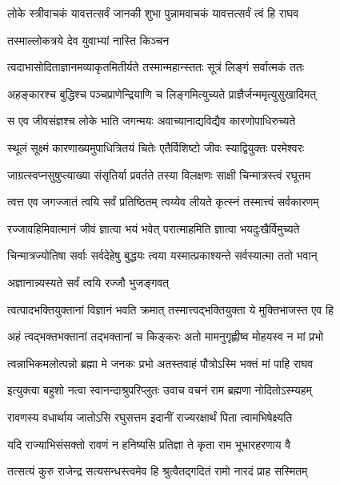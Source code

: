 \twolineshloka
{लोके स्त्रीवाचकं यावत्तत्सर्वं जानकी शुभा}
{पुन्नामवाचकं यावत्तत्सर्वं त्वं हि राघव} %

\onelineshloka
{तस्माल्लोकत्रये देव युवाभ्यां नास्ति किञ्चन} %

\twolineshloka
{त्वदाभासोदिताज्ञानमव्याकृतमितीर्यते}
{तस्मान्महान्स्ततः सूत्रं लिङ्गं सर्वात्मकं ततः} %

\twolineshloka
{अहङ्कारश्च बुद्धिश्च पञ्चप्राणेन्द्रियाणि च}
{लिङ्गमित्युच्यते प्राज्ञैर्जन्ममृत्युसुखादिमत्} %

\twolineshloka
{स एव जीवसंज्ञश्च लोके भाति जगन्मयः}
{अवाच्यानाद्यविद्यैव कारणोपाधिरुच्यते} %

\twolineshloka
{स्थूलं सूक्ष्मं कारणाख्यमुपाधित्रितयं चितेः}
{एतैर्विशिष्टो जीवः स्याद्वियुक्तः परमेश्वरः} %

\twolineshloka
{जाग्रत्स्वप्नसुषुप्त्याख्या संसृतिर्या प्रवर्तते}
{तस्या विलक्षणः साक्षी चिन्मात्रस्त्वं रघूत्तम} %

\twolineshloka
{त्वत्त एव जगज्जातं त्वयि सर्वं प्रतिष्ठितम्}
{त्वय्येव लीयते कृत्स्नं तस्मात्त्वं सर्वकारणम्} %

\twolineshloka
{रज्जावहिमिवात्मानं जीवं ज्ञात्वा भयं भवेत्}
{परात्माहमिति ज्ञात्वा भयदुःखैर्विमुच्यते} %

\twolineshloka
{चिन्मात्रज्योतिषा सर्वाः सर्वदेहेषु बुद्धयः}
{त्वया यस्मात्प्रकाश्यन्ते सर्वस्यात्मा ततो भवान्} %

\onelineshloka
{अज्ञानान्न्यस्यते सर्वं त्वयि रज्जौ भुजङ्गवत्} %

\twolineshloka
{त्वत्पादभक्तियुक्तानां विज्ञानं भवति क्रमात्}
{तस्मात्त्वद्भक्तियुक्ता ये मुक्तिभाजस्त एव हि} %

\twolineshloka
{अहं त्वद्भक्तभक्तानां तद्भक्तानां च किङ्करः}
{अतो मामनुगृह्णीष्व मोहयस्व न मां प्रभो} %

\twolineshloka
{त्वन्नाभिकमलोत्पन्नो ब्रह्मा मे जनकः प्रभो}
{अतस्तवाहं पौत्रोऽस्मि भक्तं मां पाहि राघव} %

\twolineshloka
{इत्युक्त्वा बहुशो नत्वा स्वानन्दाश्रुपरिप्लुतः}
{उवाच वचनं राम ब्रह्मणा नोदितोऽस्म्यहम्} %

\twolineshloka
{रावणस्य वधार्थाय जातोऽसि रघुसत्तम}
{इदानीं राज्यरक्षार्थं पिता त्वामभिषेक्ष्यति} %

\twolineshloka
{यदि राज्याभिसंसक्तो रावणं न हनिष्यसि}
{प्रतिज्ञा ते कृता राम भूभारहरणाय वै} %

\twolineshloka
{तत्सत्यं कुरु राजेन्द्र सत्यसन्धस्त्वमेव हि}
{श्रुत्वैतद्गदितं रामो नारदं प्राह सस्मितम्} %

